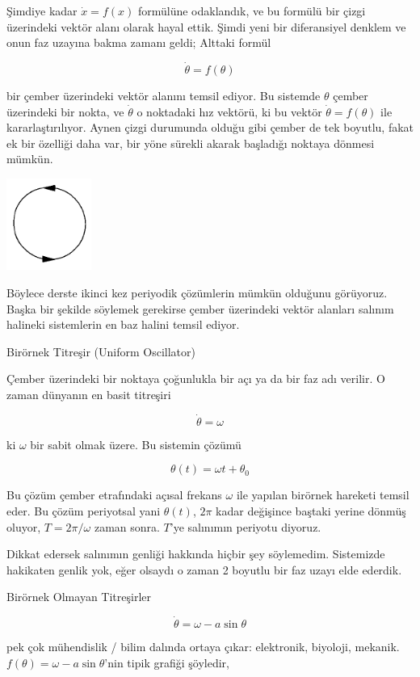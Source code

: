 \documentclass[12pt,fleqn]{article}\usepackage{../../common}
\begin{document}
Şimdiye kadar $\dot{x} = f(x)$ formülüne odaklandık, ve bu formülü bir çizgi
üzerindeki vektör alanı olarak hayal ettik. Şimdi yeni bir diferansiyel denklem
ve onun faz uzayına bakma zamanı geldi; Alttaki formül

$$ \dot{\theta} = f(\theta) $$

bir çember üzerindeki vektör alanını temsil ediyor. Bu sistemde $\theta$ çember
üzerindeki bir nokta, ve $\dot{\theta}$ o noktadaki hız vektörü, ki bu vektör
$\dot{\theta} = f(\theta)$ ile kararlaştırılıyor. Aynen çizgi durumunda olduğu
gibi çember de tek boyutlu, fakat ek bir özelliği daha var, bir yöne sürekli
akarak başladığı noktaya dönmesi mümkün.

\includegraphics[height=3cm]{04_14.png}

Böylece derste ikinci kez periyodik çözümlerin mümkün olduğunu görüyoruz. Başka
bir şekilde söylemek gerekirse çember üzerindeki vektör alanları salınım
halineki sistemlerin en baz halini temsil ediyor.

Birörnek Titreşir (Uniform Oscillator)

Çember üzerindeki bir noktaya çoğunlukla bir açı ya da bir faz adı verilir. O
zaman dünyanın en basit titreşiri

$$ \dot{\theta} = \omega $$

ki $\omega$ bir sabit olmak üzere. Bu sistemin çözümü

$$ \theta(t) = \omega t + \theta_0 $$

Bu çözüm çember etrafındaki açısal frekans $\omega$ ile yapılan birörnek
hareketi temsil eder. Bu çözüm periyotsal yani $\theta(t)$, $2\pi$ kadar
değişince baştaki yerine dönmüş oluyor, $T = 2\pi/\omega$ zaman sonra. $T$'ye
salınımın periyotu diyoruz.

Dikkat edersek salınımın genliği hakkında hiçbir şey söylemedim. Sistemizde
hakikaten genlik yok, eğer olsaydı o zaman 2 boyutlu bir faz uzayı elde ederdik.

Birörnek Olmayan Titreşirler

$$ \dot{\theta} = \omega - a\sin\theta $$

pek çok mühendislik / bilim dalında ortaya çıkar: elektronik, biyoloji,
mekanik. $f(\theta) = \omega - a\sin\theta$'nin tipik grafiği şöyledir,
\end{document}
